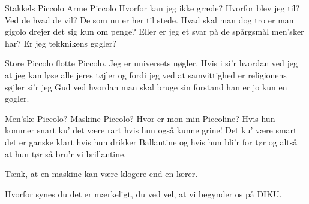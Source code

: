 \documentclass[a4paper,11pt]{article}
\begin{document}
\begin{song}
Stakkels Piccolo
Arme Piccolo
Hvorfor kan jeg ikke græde?
Hvorfor blev jeg til?
Ved de hvad de vil?
De som nu er her til stede.
Hvad skal man dog tro
er man gigolo
drejer det sig kun om penge?
Eller er jeg et svar
på de spårgsmål men'sker har?
Er jeg tekknikens gøgler?

Store Piccolo
flotte Piccolo.
Jeg er universets nøgler.
Hvis i si'r hvordan
ved jeg at jeg kan
løse alle jeres tøjler
og fordi jeg ved 
at samvittighed
er religionens søjler
si'r jeg Gud ved hvordan
man skal bruge sin forstand
han er jo kun en gøgler.

Men'ske Piccolo?
Maskine Piccolo?
Hvor er mon min Piccoline?
Hvis hun kommer snart
ku' det være rart
hvis hun også kunne grine!
Det ku' være smart
det er ganske klart
hvis hun drikker Ballantine
og hvis hun bli'r for tør
og altså at hun tør
så bru'r vi brillantine.
\end{song}

\begin{sketch}

 Tænk, at en maskine kan være klogere end en lærer.

 Hvorfor synes du det er mærkeligt, du ved vel, at vi begynder os på
DIKU.

\end{sketch}
\end{document}
